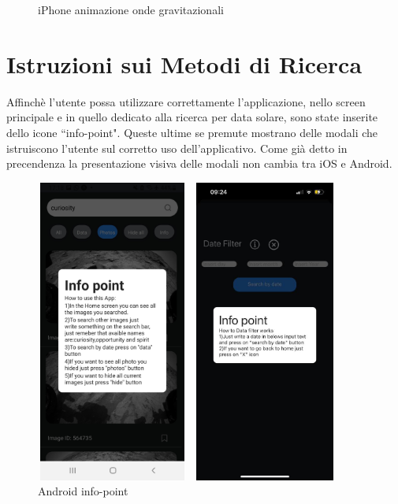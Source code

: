 \begin{figure}[H]
\begin{minipage}[h]{0.47\textwidth}
        \caption{\label{animazioneIphone} iPhone animazione onde gravitazionali}
    \end{minipage}
\end{figure}

\section{Istruzioni sui Metodi di Ricerca}
Affinch\`e l'utente possa utilizzare correttamente l'applicazione, nello screen principale e in quello dedicato alla ricerca per data solare, sono state inserite dello icone ``info-point".
Queste ultime se premute mostrano delle modali che istruiscono l'utente sul corretto uso dell'applicativo. Come gi\`a detto in precendenza la presentazione visiva delle modali non cambia tra iOS e Android.
\begin{figure}[H]
    \begin{minipage}[h]{0.47\textwidth}
        \centering
        \includegraphics[width=5cm, height=10cm]{images/immaginiAndroid/infoPoint.jpg}
        \caption{\label{infoPointAndroid} Android info-point}
    \end{minipage}
    \hfill
    \begin{minipage}[h]{0.47\textwidth}
        \centering
        \includegraphics[width=5cm, height=10cm]{images/immaginiPhone/infoPoint.jpeg}

\end{minipage}
\end{figure}
